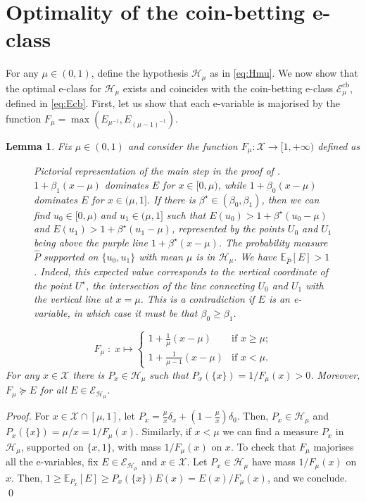 \documentclass[3p, authoryear, 10pt]{elsarticle}%
\newcommand{\E}{\mathbb E}
\newcommand{\Ecb}{\mathcal E^{\mathrm{cb}}}
\newcommand{\Ee}{\mathcal E}
\newcommand{\Hh}{\mathcal H}
\newcommand{\X}{\mathcal X}
\newtheorem{lemma}{Lemma}
\begin{document}
\section{Optimality of the coin-betting e-class}\label{sec:optcoin}
For any $\mu\in(0,1)$, define the hypothesis $\Hh_\mu$ as in \eqref{eq:Hmu}. We now show that the optimal e-class for $\Hh_\mu$ exists and coincides with the coin-betting e-class $\Ecb_\mu$, defined in \eqref{eq:Ecb}. First, let us show that each e-variable is majorised by the function $F_\mu = \max(E_{\mu^{-1}}, E_{(\mu-1)^{-1}})$. 

\begin{lemma}\label{lemma:F}
    Fix $\mu\in(0,1)$ and consider the function $F_\mu:\X\to[1,+\infty)$ defined as 
    \begin{figure}[b!]
        \centering
        
        \caption{Pictorial representation of the main step in the proof of . $1+\beta_1(x-\mu)$ dominates $E$ for $x\in[0,\mu)$, while $1+\beta_0(x-\mu)$ dominates $E$ for $x\in(\mu, 1]$. If there is $\beta^\star\in(\beta_0,\beta_1)$, then we can find $u_0\in[0,\mu)$ and $u_1\in(\mu,1]$ such that $E(u_0)>1+\beta^\star(u_0-\mu)$ and $E(u_1)>1+\beta^\star(u_1-\mu)$, represented by the points $U_0$ and $U_1$ being above the purple line $1+\beta^\star(x-\mu)$. The probability measure $\hat P$ supported on $\{u_0,u_1\}$ with mean $\mu$ is in $\Hh_\mu$. We have $\E_{\hat P}[E]>1$. Indeed, this expected value corresponds to the vertical coordinate of the point $U^\star$, the intersection of the line connecting $U_0$ and $U_1$ with the vertical line at $x=\mu$. This is a contradiction if $E$ is an e-variable, in which case it must be that $\beta_0\geq\beta_1$.}
        \label{fig:mu}
    \end{figure}
    $$F_\mu\;:\;x\mapsto\begin{cases} 1 + \frac{1}{\mu}(x-\mu)&\text{if $x\geq\mu$;}\\ 1 + \frac{1}{\mu-1}(x-\mu)&\text{if $x<\mu$.}\end{cases}$$ For any $x\in\X$ there is $P_x\in\Hh_\mu$ such that $P_x(\{x\})= 1/F_\mu(x)>0$. Moreover, $F_\mu\succeq E$ for all $E\in\Ee_{\Hh_\mu}$.
\end{lemma}
\begin{proof}
    For $x\in\X\cap[\mu,1]$, let $P_x = \frac{\mu}{x}\delta_x + (1-\frac{\mu}{x})\delta_0$. Then, $P_x\in\Hh_\mu$ and $P_x(\{x\}) = \mu/x = 1/F_\mu(x)$. Similarly, if $x<\mu$ we can find a measure $P_x$ in $\Hh_\mu$, supported on $\{x,1\}$, with mass $1/F_\mu(x)$ on $x$. To check that $F_\mu$ majorises all the e-variables, fix $E\in\Ee_{\Hh_\mu}$ and $x\in\X$. Let  $P_x\in\Hh_\mu$ have mass $1/F_\mu(x)$ on $x$. Then, $1\geq \E_{P_x}[E] \geq P_x(\{x\})E(x) = E(x)/F_\mu(x)$, and we conclude. \qed
\end{proof}
\end{document}
